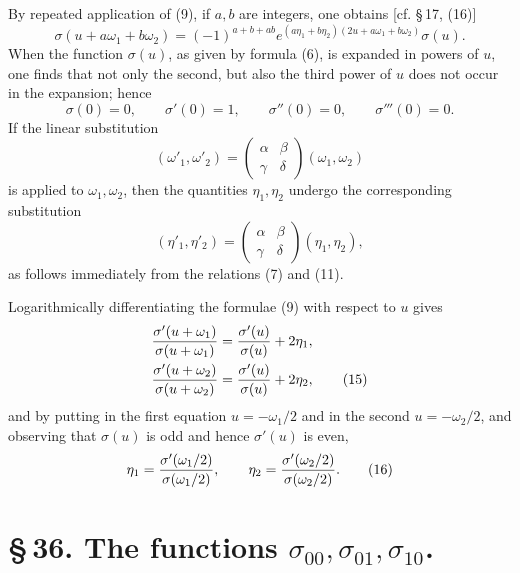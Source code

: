 \documentclass[11pt]{article}
\begin{document}
By repeated application of (9), if $a,b$ are integers, one obtains [cf. \S\,17, (16)]
\begin{equation}
\sigma(u+a\omega_1+b\omega_2)
=(-1)^{a+b+ab}e^{(a\eta_1+b\eta_2)(2u+a\omega_1+b\omega_2)}\sigma(u). \tag{11}
\end{equation}
When the function $\sigma(u)$, as given by formula (6), is expanded in powers of $u$, one finds that not only the second, but also the third power of $u$ does not occur in the expansion; hence
\begin{equation}
\sigma(0)=0,
\qquad \sigma'(0)=1,
\qquad \sigma''(0)=0,
\qquad \sigma'''(0)=0. \tag{12}
\end{equation}
If the linear substitution
\begin{equation}
(\omega'_1,\omega'_2)=
\begin{pmatrix}\alpha&\beta\\ \gamma&\delta\end{pmatrix}(\omega_1,\omega_2) \tag{13}
\end{equation}
is applied to $\omega_1,
\omega_2$, then the quantities $\eta_1,\eta_2$ undergo the corresponding substitution
\begin{equation}
(\eta'_1,\eta'_2)=
\begin{pmatrix}\alpha&\beta\\ \gamma&\delta\end{pmatrix}(\eta_1,\eta_2), \tag{14}
\end{equation}
as follows immediately from the relations (7) and (11).

Logarithmically differentiating the formulae (9) with respect to $u$ gives
\begin{align}
{\sigma'(u+\omega_1)\over\sigma(u+\omega_1)}&={\sigma'(u)\over\sigma(u)}+2\eta_1,\notag\\
{\sigma'(u+\omega_2)\over\sigma(u+\omega_2)}&={\sigma'(u)\over\sigma(u)}+2\eta_2, \tag{15}
\end{align}
and by putting in the first equation $u=-\omega_1/2$ and in the second $u=-\omega_2/2$, and observing that $\sigma(u)$ is odd and hence $\sigma'(u)$ is even,
\begin{equation}
\eta_1={\sigma'(\omega_1/2)\over\sigma(\omega_1/2)},
\qquad
\eta_2={\sigma'(\omega_2/2)\over\sigma(\omega_2/2)}. \tag{16}
\end{equation}

\section*{\S\,36. The functions $\sigma_{00},\sigma_{01},\sigma_{10}$.}
\end{document}
